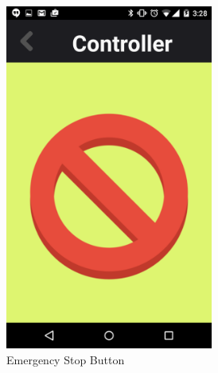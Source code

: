 \documentclass[12pt]{article}
\begin{document}
\begin{figure}[!htbp]
\begin{subfigure}[b]{0.45\textwidth}
    \includegraphics[width=0.75\textwidth]{stop.png}
    \caption{Emergency Stop Button}
    \label{stop}
    \end{subfigure}
    \begin{subfigure}[b]{0.45\textwidth}
    \centering

\end{subfigure}
\end{figure}
\end{document}
